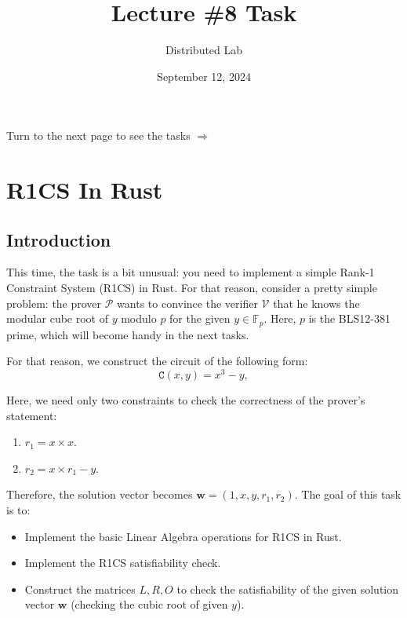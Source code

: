 \documentclass{zkdl-tests-template}
\title{\huge\sffamily\bfseries Lecture \#8 Task}
\author{\Large\sffamily Distributed Lab}
\date{\sffamily September 12, 2024}
\begin{document}
\pagestyle{fancy}

\maketitle

\vspace{20px}

\begin{center}
    Turn to the next page to see the tasks $\Longrightarrow$
\end{center}

\section{R1CS In Rust}

\subsection{Introduction}

This time, the task is a bit unusual: you need to implement a simple Rank-1 Constraint System (R1CS) in Rust. 
For that reason, consider a pretty simple problem: the prover $\mathcal{P}$ wants to convince the verifier
$\mathcal{V}$ that he knows the modular cube root of $y$ modulo $p$ for the given $y \in \mathbb{F}_p$. Here,
$p$ is the BLS12-381 prime, which will become handy in the next tasks.

For that reason, we construct the circuit of the following form:
\begin{equation*}
    \mathtt{C}(x,y) = x^3 - y,
\end{equation*}

Here, we need only two constraints to check the correctness of the prover's statement:
\begin{enumerate}
    \item $r_1 = x \times x$.
    \item $r_2 = x \times r_1 - y$.
\end{enumerate}

Therefore, the solution vector becomes $\mathbf{w} = (1,x,y,r_1,r_2)$. The goal of this task is to:
\begin{itemize}
    \item Implement the basic Linear Algebra operations for R1CS in Rust.
    \item Implement the R1CS satisfiability check.
    \item Construct the matrices $L,R,O$ to check the satisfiability of the given solution vector $\mathbf{w}$ (checking the cubic root of given $y$).
\end{itemize}
\end{document}
